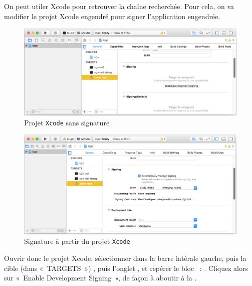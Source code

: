 
On peut utiler Xcode pour retrouver la chaîne recherchée. Pour cela, on va modifier le projet Xcode engendré pour signer l'application engendrée. 





\begin{figure}[!t]
  \centering
  \includegraphics[width=15cm]{chapitre-cocoa-features/projet-xcode-sans-signature.png}
  \caption{Projet \texttt{Xcode} sans signature}
  \ligne
\end{figure}


\begin{figure}[!t]
  \centering
  \includegraphics[width=15cm]{chapitre-cocoa-features/projet-xcode-avec-signature.png}
  \caption{Signature à partir du projet \texttt{Xcode}}
  \ligne
\end{figure}

Ouvrir donc le projet Xcode, sélectionner  dans la barre latérale gauche, puis la cible (dans «~TARGETS~») , puis l'onglet , et repérer le bloc ~: . Cliquez alors sur «~Enable Development Signing~», de façon à aboutir à la . 

